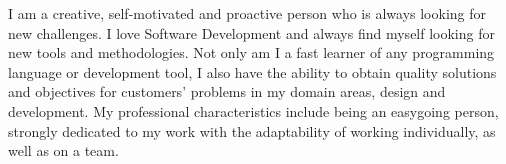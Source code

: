 %
%
%
%


\par{
    I am a creative, self-motivated and proactive person who is always looking for new challenges. I love Software Development and always find myself looking for new tools and methodologies.
    Not only am I a fast learner of any programming language or development tool, I also have the ability to obtain quality solutions and objectives for customers’ problems in my domain areas, design and development. 
    My professional characteristics include being an easygoing person, strongly dedicated to my work with the adaptability of working individually, as well as on a team.
    }